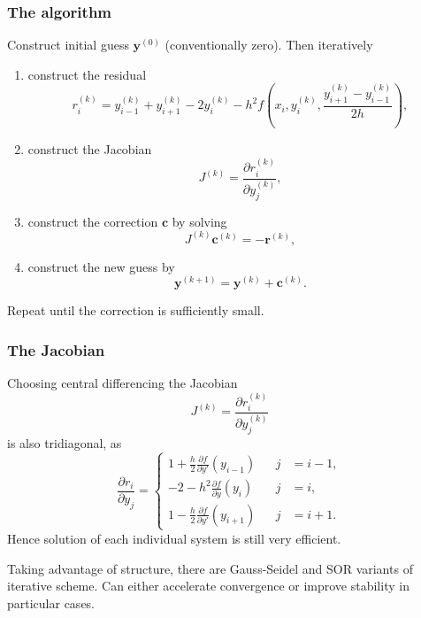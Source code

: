 \documentclass{beamer}
\newcommand{\by}{{\boldsymbol{y}}}
\newcommand{\bfm}[1]{{\boldsymbol{#1}}}
\newcommand{\pda}[2]{\frac{\partial{#1}}{\partial{#2}}}
\begin{document}
\begin{frame}
  \frametitle{The algorithm}

  Construct initial guess $\by^{(0)}$ (conventionally zero). Then
  iteratively
  \begin{enumerate}
  \item<1-> construct the residual
    \begin{equation*}
      r^{(k)}_i = y^{(k)}_{i-1} + y^{(k)}_{i+1} - 2 y^{(k)}_i - h^2 f
      \left( x_i, y^{(k)}_i, \frac{y^{(k)}_{i+1} - y^{(k)}_{i-1}}{2 h}
      \right),
    \end{equation*}
  \item<2-> construct the Jacobian
    \begin{equation*}
      J^{(k)} = \pda{r_i^{(k)}}{y_j^{(k)}},
    \end{equation*}
  \item<3-> construct the correction $\bfm{c}$ by solving
    \begin{equation*}
      J^{(k)} \bfm{c}^{(k)} = - \bfm{r}^{(k)},
    \end{equation*}
  \item<4-> construct the new guess by
      \begin{equation*}
        \by^{(k+1)} = \by^{(k)} + \bfm{c}^{(k)}.
      \end{equation*}
  \end{enumerate} \pause[5]
  \vspace{-1ex}
  Repeat until the correction is sufficiently small.

\end{frame}

\begin{frame}
  \frametitle{The Jacobian}

  Choosing central differencing the Jacobian
  \begin{equation*}
    J^{(k)} = \pda{r_i^{(k)}}{y_j^{(k)}}
  \end{equation*}
  is also tridiagonal, as
  \begin{equation*}
    \pda{r_i}{y_j} = \left\{
      \begin{aligned}
        1 + \tfrac{h}{2} \pda{f}{y'} (y_{i-1}) && j & = i - 1, \\
        -2 - h^2 \pda{f}{y} (y_{i}) && j & = i, \\
        1 - \tfrac{h}{2} \pda{f}{y'} (y_{i+1}) && j & = i + 1.
      \end{aligned} \right.
  \end{equation*} \pause
  Hence solution of each individual system is still very
  efficient. \pause

  \vspace{1ex}

  Taking advantage of structure, there are Gauss-Seidel and SOR
  variants of iterative scheme. Can either accelerate convergence or
  improve stability in particular cases.

\end{frame}
\end{document}
